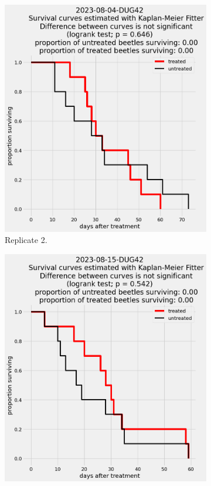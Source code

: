 \documentclass[12pt,letterpaper,english,bibliography=totocnumbered, abstract=on]{scrartcl}
\begin{document}
\begin{figure}[h]
\begin{subfigure}{.3\textwidth}
		\includegraphics[width=\textwidth]{images/survival_curves/2023-08-04-DUG42}
		\caption{Replicate 2.}
	\end{subfigure}
	\begin{subfigure}{.3\textwidth}
		\includegraphics[width=\textwidth]{images/survival_curves/2023-08-15-DUG42}

\end{subfigure}
\end{figure}
\end{document}
